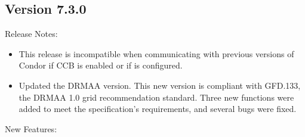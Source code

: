 \subsection*{\label{sec:New-7-3-0}Version 7.3.0}

\noindent Release Notes:

\begin{itemize}

\item This release is incompatible when communicating with
previous versions of Condor if CCB is enabled or if
 is configured.

\item Updated the DRMAA version.
This new version is compliant with GFD.133,
the DRMAA 1.0 grid recommendation standard.
Three new functions were added to meet the specification's requirements,
and several bugs were fixed.

\end{itemize}


\noindent New Features:

